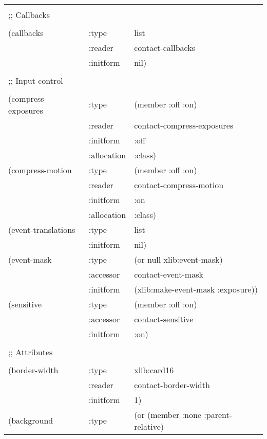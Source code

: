 \begin{flushright}
\parbox[t]{6.125in}{
\tt
\begin{tabular}{lll}
\raggedright
&\\
;; Callbacks \\
&\\
   (callbacks &          :type & list \\
&                        :reader &  contact-callbacks \\
&                        :initform &  nil) \\
&\\
;; Input control\\
&\\  
   (compress-exposures & :type & (member :off :on) \\
&                        :reader &  contact-compress-exposures \\
&                        :initform &  :off \\
&                        :allocation &  :class) \\
   (compress-motion &    :type & (member :off :on) \\
&                        :reader & contact-compress-motion \\
&                        :initform & :on \\
&                        :allocation & :class) \\ 
   (event-translations & :type & list \\
&                        :initform & nil) \\ 
   (event-mask &         :type & (or null xlib:event-mask) \\
&                        :accessor & contact-event-mask \\
&                        :initform & (xlib:make-event-mask :exposure)) \\
   (sensitive &          :type & (member :off :on) \\
&                        :accessor & contact-sensitive \\
&                        :initform & :on) \\
&\\
;; Attributes \\
&\\
   (border-width &       :type & xlib:card16 \\
&                        :reader & contact-border-width \\
&                        :initform & 1) \\
   (background & :type & (or (member :none :parent-relative) \\

\end{tabular}}
\end{flushright}
